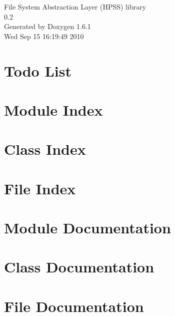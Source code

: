 \documentclass[a4paper]{book}
\begin{document}
\begin{titlepage}
\vspace*{7cm}
\begin{center}
{\Large File System Abstraction Layer (HPSS) library \\[1ex]\large 0.2 }\\
\vspace*{1cm}
{\large Generated by Doxygen 1.6.1}\\
\vspace*{0.5cm}
{\small Wed Sep 15 16:19:49 2010}\\
\end{center}
\end{titlepage}
\clearemptydoublepage
{}
\tableofcontents
\clearemptydoublepage
{}
\chapter{Todo List}
\label{todo}

\chapter{Module Index}

\chapter{Class Index}

\chapter{File Index}

\chapter{Module Documentation}

\chapter{Class Documentation}

\chapter{File Documentation}

























\printindex
\end{document}

